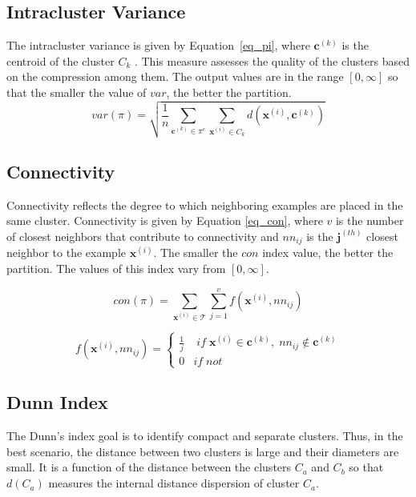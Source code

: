 \subsection{Intracluster Variance}

The intracluster variance is given by Equation~\eqref{eq_pi}, where $\mathbf{c}^{(k)}$ is the centroid of the cluster $C_k$ \cite{handl2005computational}. This measure assesses the quality of the clusters based on the compression among them. The output values are in the range $[0,\infty]$ so that the smaller the value of $var$, the better the partition. 
\begin{equation}
\label{eq_pi}
    var(\pi)=\sqrt{\frac{1}{n} \sum_{\mathbf{c}^{(k)} \in \pi^e} \sum_{\mathbf{x}^{(i)} \in C_k} d(\mathbf{x}^{(i)},\mathbf{c}^{(k)})}
\end{equation}

\subsection{Connectivity}

Connectivity reflects the degree to which neighboring examples are placed in the same cluster. Connectivity is given by Equation \ref{eq_con}, where $v$ is the number of closest neighbors that contribute to connectivity and $nn_{ij}$ is the $\mathbf{j}^{(th)}$ closest neighbor to the example $\mathbf{x}^{(i)}$. The smaller the $con$ index value, the better the partition. The values of this index vary from $[0,\infty]$.

\begin{equation}
\label{eq_con}
    con(\pi) = \sum_{\mathbf{x}^{(i)} \in \mathcal{T}} \sum_{j=1}^v f(\mathbf{x}^{(i)},nn_{ij})
\end{equation}

\begin{equation}
    f(\mathbf{x}^{(i)},nn_{ij})=\left\{\begin{matrix}
\frac{1}{j} & \;if\;\mathbf{x}^{(i)} \in \mathbf{c}^{(k)},\; nn_{ij} \notin \mathbf{c}^{(k)}\\ 
0 & if\;not 
\end{matrix}\right.
\end{equation}

\subsection{Dunn Index}

The Dunn's index \cite{halkidi2002clustering} goal is to identify compact and separate clusters. Thus, in the best scenario, the distance between two clusters is large and their diameters are small. It is a function of the distance between the clusters $C_a$ and $C_b$ so that $d(C_a)$ measures the internal distance dispersion of cluster $C_a$. 

